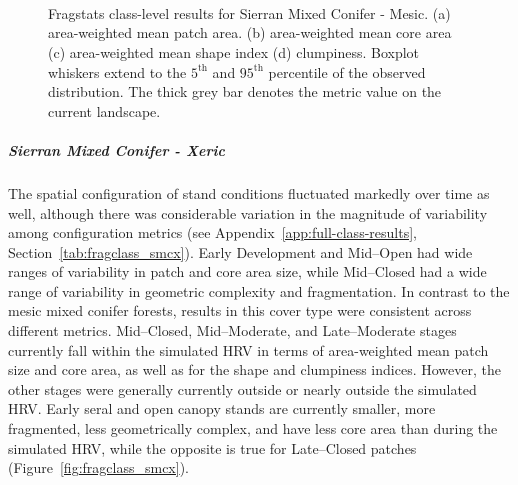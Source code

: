 \begin{figure}[!htbp]
  \centering
   \\
   \\
   \\
\caption{Fragstats class-level results for Sierran Mixed Conifer - Mesic. (a) area-weighted mean patch area. (b) area-weighted mean core area (c) area-weighted mean shape index (d) clumpiness. Boxplot whiskers extend to the $5^{\text{th}}$ and $95^{\text{th}}$ percentile of the observed distribution. The thick grey bar denotes the metric value on the current landscape.}
\label{fig:fragclass_smcm}
\end{figure}




\subparagraph{Sierran Mixed Conifer - Xeric}
The spatial configuration of stand conditions fluctuated markedly over time as well, although there was considerable variation in the magnitude of variability among configuration metrics (see Appendix~\ref{app:full-class-results}, Section~\ref{tab:fragclass_smcx}). Early Development and Mid--Open had wide ranges of variability in patch and core area size, while Mid--Closed had a wide range of variability in geometric complexity and fragmentation. In contrast to the mesic mixed conifer forests, results in this cover type were consistent across different metrics. Mid--Closed, Mid--Moderate, and Late--Moderate stages currently fall within the simulated HRV in terms of area-weighted mean patch size and core area, as well as for the shape and clumpiness indices. However, the other stages were generally currently outside or nearly outside the simulated HRV. Early seral and open canopy stands are currently smaller, more fragmented, less geometrically complex, and have less core area than during the simulated HRV, while the opposite is true for Late--Closed patches (Figure~\ref{fig:fragclass_smcx}).


